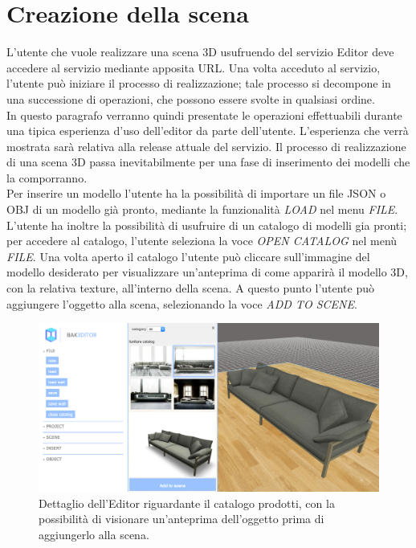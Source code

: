 \section{Creazione della scena}
\label{sec:chapter_caso_uso_creazione_scena}

L’utente che vuole realizzare una scena 3D usufruendo del servizio Editor deve accedere al servizio mediante apposita URL.
Una volta acceduto al servizio, l’utente può iniziare il processo di realizzazione; tale processo si decompone in una successione di operazioni, che possono essere svolte in qualsiasi ordine.
\\
In questo paragrafo verranno quindi presentate le operazioni effettuabili durante una tipica esperienza d’uso dell’editor da parte dell’utente. 
L’esperienza che verrà mostrata sarà relativa alla release attuale del servizio.
Il processo di realizzazione di una scena 3D passa inevitabilmente per una fase di inserimento dei modelli che la comporranno. 
\\
Per inserire un modello l’utente ha la possibilità di importare un file JSON o OBJ di un modello già pronto, mediante la funzionalità \emph{LOAD} nel menu \emph{FILE}. 
L’utente ha inoltre la possibilità di usufruire di un catalogo di modelli gia pronti; per accedere al catalogo, l’utente seleziona la voce \emph{OPEN CATALOG} nel menù \emph{FILE}. Una volta aperto il catalogo l’utente può cliccare sull’immagine del modello desiderato per visualizzare un'anteprima di come apparirà il modello 3D, con la relativa texture, all'interno della scena.
A questo punto l'utente può aggiungere l'oggetto alla scena, selezionando la voce \emph{ADD TO SCENE}. 
\\
\begin{figure}[htb]
 \centering
 \includegraphics[width=1\linewidth]{images/chapter_caso_uso/caso_uso_catalogo.png}\hfill
 \caption[Catalogo prodotti]{Dettaglio dell'Editor riguardante il catalogo prodotti, con la possibilità di visionare un'anteprima dell'oggetto prima di aggiungerlo alla scena.}
 \label{fig:caso_uso_catalogo}
\end{figure}
